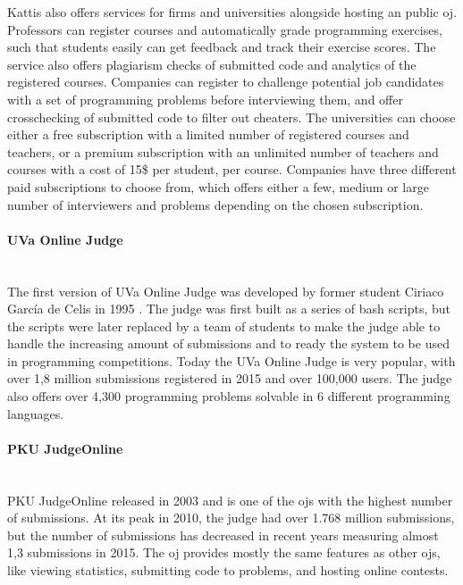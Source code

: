 Kattis also offers services for firms and universities alongside hosting an public \gls{oj}. Professors can register courses and automatically grade programming exercises, such that students easily can get feedback and track their exercise scores. The service also offers plagiarism checks of submitted code and analytics of the registered courses. Companies can register to challenge potential job candidates with a set of programming problems before interviewing them, and offer crosschecking of submitted code to filter out cheaters. The universities can choose either a free subscription with a limited number of registered courses and teachers, or a premium subscription with an unlimited number of teachers and courses with a cost of 15\$ per student, per course. Companies have three different paid subscriptions to choose from, which offers either a few, medium or large number of interviewers and problems depending on the chosen subscription.

\paragraph*{UVa Online Judge} \hfill \\
The first version of UVa Online Judge \cite{UVA} was developed by former student Ciriaco García de Celis in 1995 \cite{a:Revilla2008}. The judge was first built as a series of bash scripts, but the scripts were later replaced by a team of students to make the judge able to handle the increasing amount of submissions and to ready the system to be used in programming competitions. Today the UVa Online Judge is very popular, with over 1,8 million submissions registered in 2015 and over 100,000 users. The judge also offers over 4,300 programming problems solvable in 6 different programming languages.

\paragraph*{PKU JudgeOnline} \hfill \\
PKU JudgeOnline \cite{PKU} released in 2003 and is one of the \gls{ojs} with the highest number of submissions. At its peak in 2010, the judge had over 1.768 million submissions, but the number of submissions has decreased in recent years measuring almost 1,3 submissions in 2015. The \gls{oj} provides mostly the same features as other \gls{ojs}, like viewing statistics, submitting code to problems, and hosting online contests.

